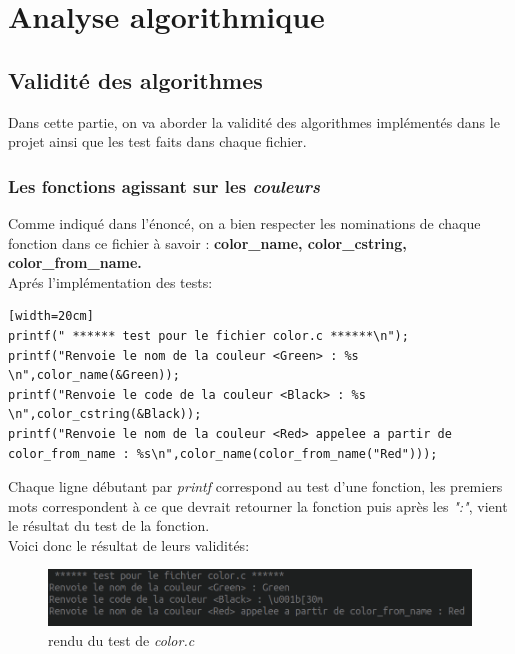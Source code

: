 \documentclass[12pt,a4paper]{extarticle}
\begin{document}
    \section{Analyse algorithmique}
    \subsection{Validit\'e des algorithmes}
    Dans cette partie, on va aborder la validit\'e des algorithmes impl\'ement\'es dans le projet
    ainsi que les test faits dans chaque fichier.
    \subsubsection{Les fonctions agissant sur les \emph{couleurs}}
    Comme indiqu\'e dans l'\'enonc\'e, on a bien respecter les nominations de chaque fonction dans ce fichier \`a savoir :
    \textbf{color\_name, color\_cstring, color\_from\_name.} 
    \\ Apr\'es l'impl\'ementation des tests:
    \begin{lstlisting}[style=CStyle][width=20cm]
printf(" ****** test pour le fichier color.c ******\n");
printf("Renvoie le nom de la couleur <Green> : %s  \n",color_name(&Green));
printf("Renvoie le code de la couleur <Black> : %s \n",color_cstring(&Black));
printf("Renvoie le nom de la couleur <Red> appelee a partir de color_from_name : %s\n",color_name(color_from_name("Red")));
    \end{lstlisting}
    Chaque ligne d\'ebutant par \emph{printf} correspond au test d'une fonction, les premiers mots correspondent 
    \`a ce que devrait retourner la fonction puis apr\`es les \emph{":"}, vient le r\'esultat du test de la fonction.\\
    Voici donc le r\'esultat de leurs validit\'es:
     \begin{figure}[h!]
         \centering
         \includegraphics[width=15cm]{img/colorc}
         \caption{rendu du test de \emph{color.c}}
     \end{figure}
\end{document}
